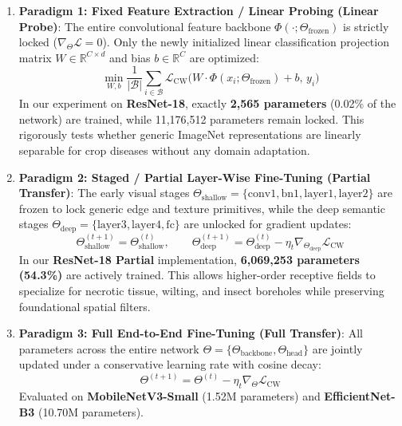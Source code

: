 \documentclass[11pt,a4paper]{article}
\begin{document}
\begin{enumerate}
    \item \textbf{Paradigm 1: Fixed Feature Extraction / Linear Probing (Linear Probe)}:
    The entire convolutional feature backbone $\Phi(\cdot; \Theta_{\text{frozen}})$ is strictly locked ($\nabla_{\Theta} \mathcal{L} = 0$). Only the newly initialized linear classification projection matrix $W \in \mathbb{R}^{C \times d}$ and bias $b \in \mathbb{R}^C$ are optimized:
    \begin{equation}
        \min_{W, b} \frac{1}{|\mathcal{B}|} \sum_{i \in \mathcal{B}} \mathcal{L}_{\text{CW}}\Big(W \cdot \Phi(x_i; \Theta_{\text{frozen}}) + b, \, y_i\Big)
    \end{equation}
    In our experiment on \textbf{ResNet-18}, exactly \textbf{2,565 parameters} (0.02\% of the network) are trained, while 11,176,512 parameters remain locked. This rigorously tests whether generic ImageNet representations are linearly separable for crop diseases without any domain adaptation.
    
    \item \textbf{Paradigm 2: Staged / Partial Layer-Wise Fine-Tuning (Partial Transfer)}:
    The early visual stages $\Theta_{\text{shallow}} = \{\text{conv1}, \text{bn1}, \text{layer1}, \text{layer2}\}$ are frozen to lock generic edge and texture primitives, while the deep semantic stages $\Theta_{\text{deep}} = \{\text{layer3}, \text{layer4}, \text{fc}\}$ are unlocked for gradient updates:
    \begin{equation}
        \Theta_{\text{shallow}}^{(t+1)} = \Theta_{\text{shallow}}^{(t)}, \qquad \Theta_{\text{deep}}^{(t+1)} = \Theta_{\text{deep}}^{(t)} - \eta_t \nabla_{\Theta_{\text{deep}}} \mathcal{L}_{\text{CW}}
    \end{equation}
    In our \textbf{ResNet-18 Partial} implementation, \textbf{6,069,253 parameters (54.3\%)} are actively trained. This allows higher-order receptive fields to specialize for necrotic tissue, wilting, and insect boreholes while preserving foundational spatial filters.
    
    \item \textbf{Paradigm 3: Full End-to-End Fine-Tuning (Full Transfer)}:
    All parameters across the entire network $\Theta = \{\Theta_{\text{backbone}}, \Theta_{\text{head}}\}$ are jointly updated under a conservative learning rate with cosine decay:
    \begin{equation}
        \Theta^{(t+1)} = \Theta^{(t)} - \eta_t \nabla_{\Theta} \mathcal{L}_{\text{CW}}
    \end{equation}
    Evaluated on \textbf{MobileNetV3-Small} (1.52M parameters) and \textbf{EfficientNet-B3} (10.70M parameters).
\end{enumerate}
\end{document}
